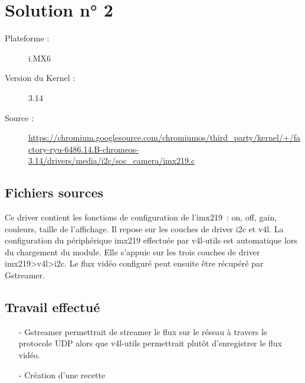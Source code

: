 
\chapter{Solution n° 2} %

\label{Chapter3} %

\begin{description}
  \item[Plateforme :] i.MX6
  \item[Version du Kernel :] 3.14
  \item[Source :] \href{https://chromium.googlesource.com/chromiumos/third_party/kernel/+/factory-ryu-6486.14.B-chromeos-3.14/drivers/media/i2c/soc_camera/imx219.c}
  {https://chromium.googlesource.com/chromiumos/third\_party/kernel/+/factory-ryu-6486.14.B-chromeos-3.14/drivers/media/i2c/soc\_camera/imx219.c} \\
\end{description}


\section{Fichiers sources}
Ce driver contient les fonctions de configuration de l’imx219 : on, off, gain,
couleurs, taille de l’affichage. Il repose sur les couches de driver i2c et v4l.
La configuration du périphérique imx219 effectuée par v4l-utils est automatique
lors du chargement du module. Elle s’appuie sur les trois couches de driver
imx219>v4l>i2c. Le flux vidéo configuré peut ensuite être récupéré par Gstreamer.

\section{Travail effectué}
\begin{itemize}
\item[-] Gstreamer permettrait de streamer le flux sur le réseau à travers le protocole
UDP alors que v4l-utils permettrait plutôt d’enregistrer le flux vidéo.
\item[-] Création d’une recette
\end{itemize}


